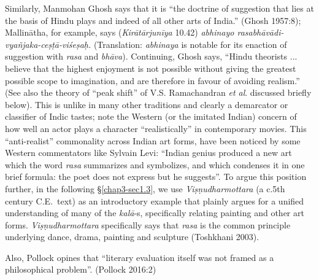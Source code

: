 Similarly, Manmohan Ghosh says that it is “the doctrine of suggestion that lies at the basis of Hindu plays and indeed of all other arts of India.” (Ghosh 1957:8); Mallinātha, for example, says (\textsl{Kirātārjunīya} 10.42) \textsl{abhinayo rasabhāvādi-vyañjaka-ceṣṭā-viśeṣaḥ.} (Translation: \textsl{abhinaya} is notable for its enaction of suggestion with \textsl{rasa} and \textsl{bhāva}). Continuing, Ghosh says, “Hindu theorists ... believe that the highest enjoyment is not possible without giving the greatest possible scope to imagination, and are therefore in favour of avoiding realism.” (See also the theory of “peak shift” of V.S. Ramachandran \textsl{et al}. discussed briefly below). This is unlike in many other traditions and clearly a demarcator or classifier of Indic tastes; note the Western (or the imitated Indian) concern of how well an actor plays a character “realistically” in contemporary movies. This “anti-realist” commonality across Indian art forms, have been noticed by some Western commentators like Sylvain Levi: “Indian genius produced a new art which the word \textsl{rasa} summarizes and symbolizes, and which condenses it in one brief formula: the poet does not express but he suggests”. To argue this position further, in the following \S\ref{chap3-sec1.3}, we use \textsl{Viṣṇudharmottara} (a c.5th century C.E.\ text) as an introductory example that plainly argues for a unified understanding of many of the \textsl{kalā}-s, specifically relating painting and other art forms. \textsl{Viṣṇudharmottara} specifically says that \textsl{rasa} is the common principle underlying dance, drama, painting and sculpture (Toshkhani 2003).

Also, Pollock opines that “literary evaluation itself was not framed as a philosophical problem”. (Pollock 2016:2)

